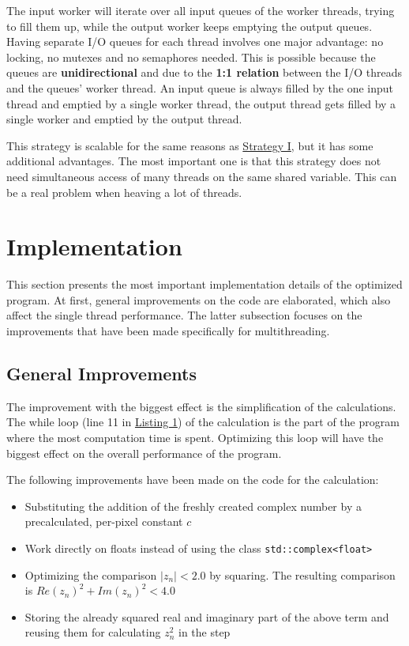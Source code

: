 The input worker will iterate over all input queues of the worker threads, trying to fill them up, while the output worker keeps emptying the output queues. Having separate I/O queues for each thread involves one major advantage: no locking, no mutexes and no semaphores needed. This is possible because the queues are \textbf{unidirectional} and due to the \textbf{1:1 relation} between the I/O threads and the queues' worker thread. An input queue is always filled by the one input thread and emptied by a single worker thread, the output thread gets filled by a single worker and emptied by the output thread.

This strategy is scalable for the same reasons as \hyperref[ssec:strategy-i]{Strategy I}, but it has some additional advantages. The most important one is that this strategy does not need simultaneous access of many threads on the same shared variable. This can be a real problem when heaving a lot of threads.

\section{Implementation}
\label{sec:implementation}

This section presents the most important implementation details of the optimized program. At first, general improvements on the code are elaborated, which also affect the single thread performance. The latter subsection focuses on the improvements that have been made specifically for multithreading.

\subsection{General Improvements}
\label{ssec:general-improvements}

The improvement with the biggest effect is the simplification of the calculations. The while loop (line 11 in \hyperref[lst:pseudo-code-original]{Listing 1}) of the \ms{} calculation is the part of the program where the most computation time is spent. Optimizing this loop will have the biggest effect on the overall performance of the program.

The following improvements have been made on the code for the \ms{} calculation:
\begin{itemize}
    \item Substituting the addition of the freshly created complex number by a precalculated, per-pixel constant $c$
    \item Work directly on floats instead of using the class \verb|std::complex<float>|
    \item Optimizing the comparison $|z_n| < 2.0$ by squaring. The resulting comparison is $Re(z_n)^2 + Im(z_n)^2 < 4.0$
    \item Storing the already squared real and imaginary part of the above term and reusing them for calculating $z_n^2$ in the step
\end{itemize}

